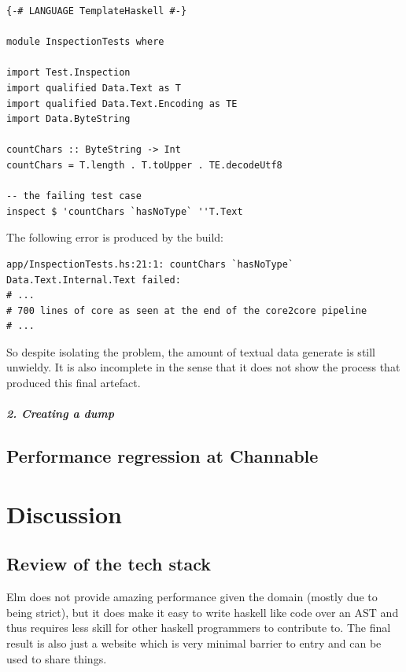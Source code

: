 \documentclass{report}
\begin{document}
\begin{verbatim}
{-# LANGUAGE TemplateHaskell #-}

module InspectionTests where

import Test.Inspection
import qualified Data.Text as T
import qualified Data.Text.Encoding as TE
import Data.ByteString

countChars :: ByteString -> Int
countChars = T.length . T.toUpper . TE.decodeUtf8

-- the failing test case
inspect $ 'countChars `hasNoType` ''T.Text
\end{verbatim}

The following error is produced by the build:

\begin{verbatim}
app/InspectionTests.hs:21:1: countChars `hasNoType` Data.Text.Internal.Text failed:
# ...
# 700 lines of core as seen at the end of the core2core pipeline
# ...
\end{verbatim}

So despite isolating the problem, the amount of textual data generate is still unwieldy.
It is also incomplete in the sense that it does not show the process that produced this final
artefact.

\paragraph{2. Creating a dump}




\section{Performance regression at Channable}

%


\chapter{Discussion}

\section{Review of the tech stack}
Elm does not provide amazing performance given the domain (mostly due to being strict),
but it does make it easy to write haskell like code over an AST and thus requires less skill
for other haskell programmers to contribute to. The final result is also just a website which is
very minimal barrier to entry and can be used to share things.
\end{document}
